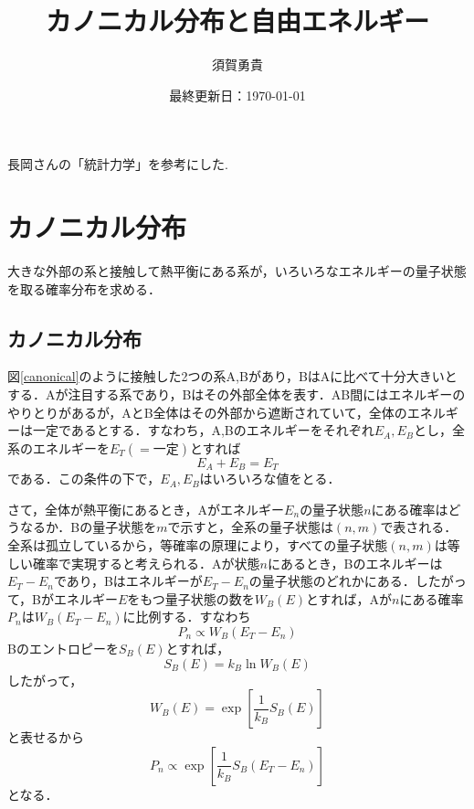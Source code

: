 \documentclass[a4paper,11pt]{jsarticle}
\begin{document}
\title{カノニカル分布と自由エネルギー}
\author{須賀勇貴}
\date{最終更新日：\today}
\maketitle
長岡さんの「統計力学」を参考にした.
\vspace{0.5cm}

\section{カノニカル分布}
大きな外部の系と接触して熱平衡にある系が，いろいろなエネルギーの量子状態を取る確率分布を求める．
\subsection*{カノニカル分布}
図\ref{canonical}のように接触した2つの系A,Bがあり，BはAに比べて十分大きいとする．Aが注目する系であり，Bはその外部全体を表す．AB間にはエネルギーのやりとりがあるが，AとB全体はその外部から遮断されていて，全体のエネルギーは一定であるとする．すなわち，A,Bのエネルギーをそれぞれ$E_A,E_B$とし，全系のエネルギーを$E_T(=\text{一定})$とすれば
\begin{equation}
  E_A + E_B = E_T
\end{equation}
である．この条件の下で，$E_A,E_B$はいろいろな値をとる．\par
さて，全体が熱平衡にあるとき，Aがエネルギー$E_n$の量子状態$n$にある確率はどうなるか．Bの量子状態を$m$で示すと，全系の量子状態は$(n,m)$で表される．全系は孤立しているから，等確率の原理により，すべての量子状態$(n,m)$は等しい確率で実現すると考えられる．Aが状態$n$にあるとき，Bのエネルギーは$E_T-E_n$であり，Bはエネルギーが$E_T-E_n$の量子状態のどれかにある．したがって，Bがエネルギー$E$をもつ量子状態の数を$W_B(E)$とすれば，Aが$n$にある確率$P_n$は$W_B(E_T-E_n)$に比例する．すなわち
\begin{equation}
  P_n \propto W_B(E_T-E_n)
\end{equation}
Bのエントロピーを$S_B(E)$とすれば，
\begin{equation}
  S_B(E) = k_B \ln{W_B(E)}
\end{equation}
したがって，
\begin{equation}
  W_B(E) = \exp{\left[ \frac{1}{k_B}S_B(E) \right]}
\end{equation}
と表せるから
\begin{equation}
  P_n \propto \exp{\left[ \frac{1}{k_B}S_B(E_T-E_n) \right]}
\end{equation}
となる．\par
\end{document}
